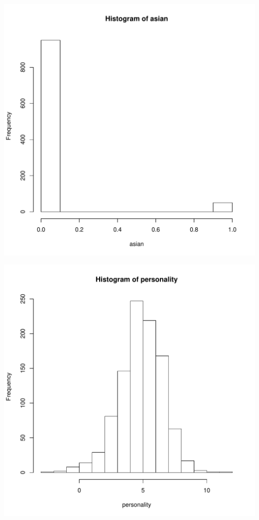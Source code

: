 \documentclass{article}\usepackage[]{graphicx}\usepackage[]{color}
\newenvironment{knitrout}{}{} %
\begin{document}
\begin{knitrout}
\color{fgcolor}
\includegraphics[width=5.5in]{figure/p2b-1} 

\includegraphics[width=5.5in]{figure/p2b-2} 


\end{knitrout}
\end{document}
